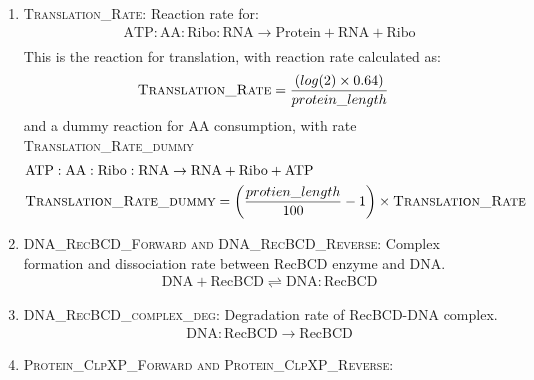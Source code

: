 \begin{enumerate}
        	\item \textsc{Translation\_Rate}: Reaction rate for: \\
        	\begin{align}
        	& \mathrm{ATP:AA:Ribo:RNA}  \rightarrow \mathrm{Protein} + \mathrm{RNA} + \mathrm{Ribo}\\
        	\end{align}
        	This is the reaction for translation, with reaction rate calculated as:\\
        	\begin{align}
        	& \textsc{Translation\_Rate} = \frac{(log(2)\times0.64)}{protein\_length}\\
        	\end{align}
        	\textrm{and a dummy reaction for AA consumption, with rate \textsc{Translation\_Rate\_dummy}} \\
        	\begin{align}
        	&\mathrm{ATP:AA:Ribo:RNA}  \rightarrow \mathrm{RNA} + \mathrm{Ribo} + \mathrm{ATP}\\
        	& \textsc{Translation\_Rate\_dummy} = \left(\frac{protien\_length}{100}-1\right)\times\textsc{Translation\_Rate}
        	\end{align}
        	
        	\item \textsc{DNA\_RecBCD\_Forward and DNA\_RecBCD\_Reverse}:
        	Complex formation and dissociation rate between RecBCD enzyme and DNA.        	
        	\begin{align}
        	& \mathrm{DNA} + \mathrm{RecBCD}  \rightleftharpoons \mathrm{DNA:RecBCD}
        	\end{align}
        	
        	
        	\item \textsc{DNA\_RecBCD\_complex\_deg}: 
        	Degradation rate of RecBCD-DNA complex. 
        	\begin{align}
        	& \mathrm{DNA:RecBCD} \rightarrow  \mathrm{RecBCD} 
        	\end{align}
        	
        	\item \textsc{Protein\_ClpXP\_Forward and Protein\_ClpXP\_Reverse}: 
        	

\end{enumerate}
